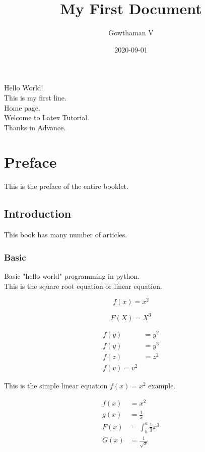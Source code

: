 \documentclass[12pt]{book}
\title{My First Document}
\date{2020-09-01}
\author{Gowthaman V}
\begin{document}


\maketitle

\newpage

\noindent
Hello World!. \\ This is my first line.\\
Home page. \\ Welcome to Latex Tutorial.\\
Thanks in Advance.


\section{Preface}
       This is the preface of the entire booklet.
\subsection{Introduction}
       This book has many number of articles.
       
\subsubsection{Basic}
         Basic "hello world" programming in python.\\This is the square root equation or linear equation.
        

       
\begin{equation}   
   f(x)=x^2 
\end{equation}

\begin{equation*}
  F(X)=X^3
\end{equation*}

\begin{align*}
	f(y) &= y^2\\f(y) &= y^3\\f(z) &= z^2 \\f(v)=v^2
\end{align*}

This is the simple linear equation $f(x)=x^2$ example.

\begin{align*}
   f(x) &= x^2\\
   g(x) &= \frac{1}{x}\\
   F(x) &= \int^a_b \frac{1}{3}x^3\\
   G(x) &= \frac{1}{\sqrt{x}}\\
\end{align*}
\end{document}
